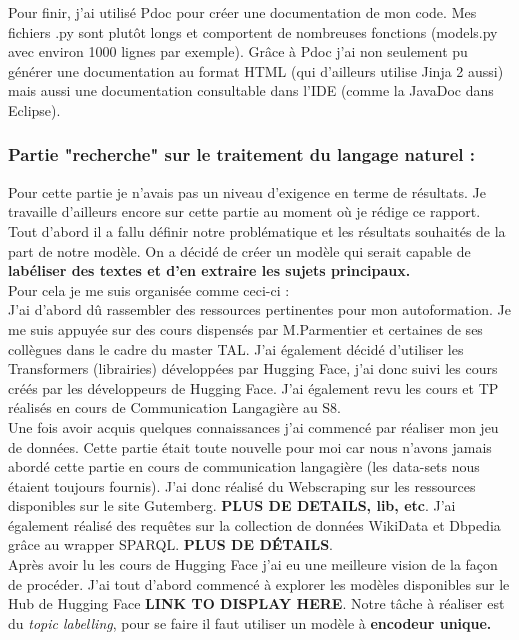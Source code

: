 \documentclass[12pt]{article}
\begin{document}
Pour finir, j'ai utilisé Pdoc pour créer une documentation de mon code. Mes fichiers .py sont plutôt longs et comportent de nombreuses fonctions (models.py avec environ 1000 lignes par exemple). Grâce à Pdoc j'ai non seulement pu générer une documentation au format HTML (qui d'ailleurs utilise Jinja 2 aussi) mais aussi une documentation consultable dans l'IDE (comme la JavaDoc dans Eclipse).


\subsubsection{Partie "recherche" sur le traitement du langage naturel :}

Pour cette partie je n'avais pas un niveau d'exigence en terme de résultats. Je travaille d'ailleurs encore sur cette partie au moment où je rédige ce rapport. \\
Tout d'abord il a fallu définir notre problématique et les résultats souhaités de la part de notre modèle. On a décidé de créer un modèle qui serait capable de \textbf{labéliser des textes et d'en extraire les sujets principaux.} \\

Pour cela je me suis organisée comme ceci-ci : \\
J'ai d'abord dû rassembler des ressources pertinentes pour mon autoformation. Je me suis appuyée sur des cours dispensés par M.Parmentier et certaines de ses collègues dans le cadre du master TAL. J'ai également décidé d'utiliser les Transformers (librairies) développées par Hugging Face, j'ai donc suivi les cours créés par les développeurs de Hugging Face. J'ai également revu les cours et TP réalisés en cours de Communication Langagière au S8. \\

Une fois avoir acquis quelques connaissances j'ai commencé par réaliser mon jeu de données. Cette partie était toute nouvelle pour moi car nous n'avons jamais abordé cette partie en cours de communication langagière (les data-sets nous étaient toujours fournis). J'ai donc réalisé du Webscraping sur les ressources disponibles sur le site Gutemberg. \textbf{PLUS DE DETAILS, lib, etc}. 
J'ai également réalisé des requêtes sur la collection de données WikiData et Dbpedia grâce au wrapper SPARQL. \textbf{PLUS DE DÉTAILS}. \\

Après avoir lu les cours de Hugging Face j'ai eu une meilleure vision de la façon de procéder. J'ai tout d'abord commencé à explorer les modèles disponibles sur le Hub de Hugging Face \textbf{LINK TO DISPLAY HERE}. Notre tâche à réaliser est du \textit{topic labelling}, pour se faire il faut utiliser un modèle à \textbf{encodeur unique.} 
\end{document}
